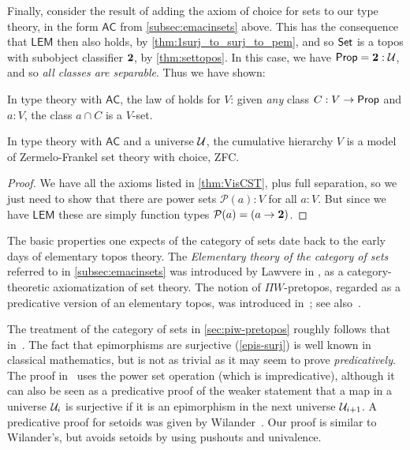 Finally, consider the result of adding the axiom of choice for sets to our type theory, in the form  $\mathsf{AC}$ from \autoref{subsec:emacinsets} above.  This has the consequence that $\mathsf{LEM}$ then also holds, by \autoref{thm:1surj_to_surj_to_pem}, and so $\mathsf{Set}$ is a topos with subobject classifier $\mathbf{2}$, by \autoref{thm:settopos}.  In this case, we have $\mathsf{Prop} = \mathbf{2}:\mathcal{U}$, and so \emph{all classes are separable}.  Thus we have shown:

\begin{lem}\label{lem:fullsep}
In type theory with $\mathsf{AC}$, the law of  holds for $V$: given \emph{any} class $C : V \to \mathsf{Prop}$ and $a : V$, the class $a \cap C$ is a $V$-set.
\end{lem}

\begin{thm}\label{thm:zfc}
In type theory with $\mathsf{AC}$ and a universe $\mathcal{U}$, the cumulative hierarchy $V$ is a model of Zermelo-Frankel set theory with choice, ZFC.
\end{thm}

\begin{proof}
We have all the axioms listed in \autoref{thm:VisCST}, plus full separation, so we just need to show that there are power sets $\mathcal{P}(a):V$ for all $a:V$.  But since we have $\mathsf{LEM}$ these are simply function types $\mathcal{P}(a) = (a\to\mathbf{2})$.
\end{proof}

\sectionNotes

The basic properties one expects of the category of sets date back to the early days of elementary topos theory.
The \emph{Elementary theory of the category of sets} referred to in \autoref{subsec:emacinsets} was introduced by Lawvere in
\cite{lawvere:etcs-long}, as a category-theoretic axiomatization of set theory.
The notion of $\Pi W$-pretopos, regarded as a predicative version of an elementary topos, was introduced in~\cite{MoerdijkPalmgren2002}; see also~\cite{palmgren:cetcs}.

The treatment of the category of sets in \autoref{sec:piw-pretopos} roughly follows that in~\cite{RijkeSpitters}.
The fact that epimorphisms are surjective (\autoref{epis-surj}) is well known in classical mathematics, but is not as trivial as it may seem to prove \emph{predicatively}.
The proof in~\cite{Mines/R/R:1988} uses the power set operation (which is impredicative), although it can also be seen as a predicative proof of the weaker statement that a map in a universe $\mathcal{U}_i$ is surjective if it is an epimorphism in the next universe $\mathcal{U}_{i+1}$.
A predicative proof for setoids was given by Wilander~\cite{Wilander2010}. 
Our proof is similar to Wilander's, but avoids setoids by using pushouts and univalence.

